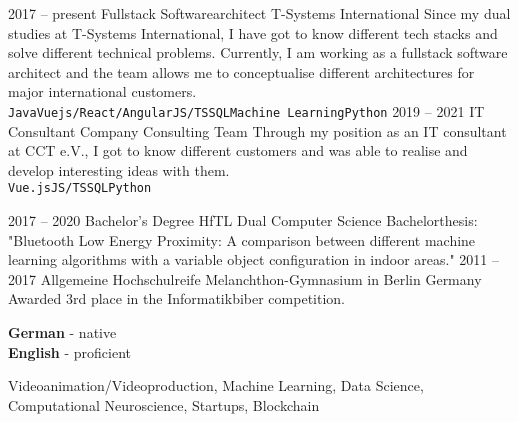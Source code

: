 \documentclass[9pt]{cvstyle}
\begin{document}

\begin{entrylist}
	\entry
		{2017 -- present}
		{Fullstack Softwarearchitect}
		{T-Systems International}
		{
			Since my dual studies at T-Systems International, I have got to know different tech stacks and solve different
			technical problems. Currently, I am working as a fullstack software architect and the team allows me to
			conceptualise different architectures for major international customers.\\
			\texttt{Java}\slashsep\texttt{Vuejs/React/Angular}\slashsep\texttt{JS/TS}\slashsep\texttt{SQL}\slashsep\texttt{Machine Learning}\slashsep\texttt{Python}
		}
	\entry
		{2019 -- 2021}
		{IT Consultant}
		{Company Consulting Team}
		{
			Through my position as an IT consultant at CCT e.V., I got to know different customers and was able to realise
			and develop interesting ideas with them.\\
			\texttt{Vue.js}\slashsep\texttt{JS/TS}\slashsep\texttt{SQL}\slashsep\texttt{Python}
		}
\end{entrylist}


\begin{entrylist}
	\entry
		{2017 -- 2020}
		{Bachelor's Degree}
		{HfTL Dual Computer Science}
		{Bachelorthesis: "Bluetooth Low Energy Proximity: A comparison between different machine learning algorithms with a variable object configuration in indoor areas."}
	\entry
		{2011 -- 2017}
		{Allgemeine Hochschulreife}
		{Melanchthon-Gymnasium in Berlin Germany}
		{Awarded 3rd place in the Informatikbiber competition.}
\end{entrylist}


\begin{minipage}[t]{0.3\textwidth}
	\vspace{-\baselineskip} 

	
	\textbf{German} - native\\
	\textbf{English} - proficient
\end{minipage}
\begin{minipage}[t]{0.7\textwidth}
	\vspace{-\baselineskip} 

	
	Videoanimation/Videoproduction, Machine Learning, Data Science, Computational Neuroscience, Startups, Blockchain
\end{minipage}
\hfill
\end{document}
